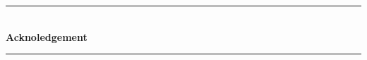 \begin{vcentrepage}
\noindent\rule[2pt]{\textwidth}{0.2pt}\\

{\center\large\textbf{Acknoledgement}\\}
\doublespacing

    \lipsum[1-2]



\noindent\rule[2pt]{\textwidth}{0.8pt}
\end{vcentrepage}

\restoregeometry
